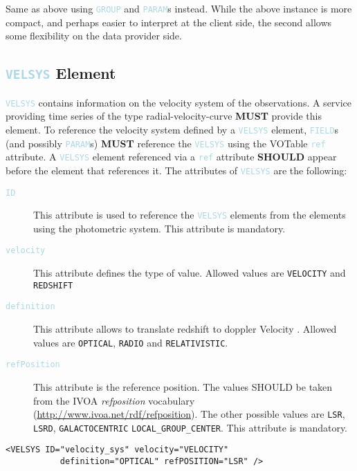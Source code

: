 \documentclass[11pt,a4paper]{ivoa}
\newcommand\elem[1]{\textcolor{LightBlue}{{\tt#1}}}
\begin{document}


Same as above using \elem{GROUP} and \elem{PARAM}s instead. While the above instance is more compact, and perhaps easier to interpret at the client side, the second allows some flexibility on the data provider side.
 


\subsection{\elem{VELSYS} Element}
\elem{VELSYS} contains information on the velocity system of the observations. A service providing time series of the type radial-velocity-curve \textbf{MUST} provide this element. To reference the velocity system defined by a \elem{VELSYS} element, \elem{FIELD}s (and possibly \elem{PARAM}s) \textbf{MUST} reference the \elem{VELSYS} using the VOTable \elem{ref} attribute. A \elem{VELSYS} element referenced via a \elem{ref} attribute \textbf{SHOULD} appear before the element that references it. The attributes of \elem{VELSYS} are the following: 

\begin{description}
     \item[\elem{ID}] This attribute is used to reference the \elem{VELSYS} elements from the elements using the photometric system. This attribute is mandatory. 
     \item[\elem{velocity}] This attribute defines the type of value. Allowed values are \verb|VELOCITY| and \verb|REDSHIFT|
     \item[\elem{definition}] This attribute allows to translate redshift to doppler Velocity \cite{STC}. Allowed values are \verb|OPTICAL|, \verb|RADIO| and \verb|RELATIVISTIC|. 
     \item[\elem{refPosition}] This attribute is the reference position. The values SHOULD be taken from the IVOA \emph{refposition} vocabulary (\url{http://www.ivoa.net/rdf/refposition}). The other possible values are \verb|LSR|, \verb|LSRD|, \verb|GALACTOCENTRIC| \verb|LOCAL_GROUP_CENTER|. This attribute is mandatory.
\end{description}

\noindent
\begingroup\footnotesize
\begin{tcolorbox}
\begin{verbatim}
<VELSYS ID="velocity_sys" velocity="VELOCITY" 
           definition="OPTICAL" refPOSITION="LSR" />
\end{verbatim}
\end{tcolorbox}
\endgroup
\end{document}
